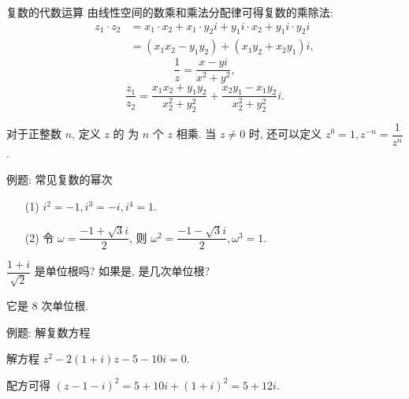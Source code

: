 \begin{frame}{复数的代数运算}
\onslide<+->
\onslide<+->由线性空间的数乘和乘法分配律可得复数的乘除法:
\onslide<+->
\begin{align*}
z_1\cdot z_2&=x_1\cdot x_2+x_1\cdot y_2i+y_1i\cdot x_2+y_1i\cdot y_2i\\
&=(x_1x_2-y_1y_2)+(x_1y_2+x_2y_1)i,
\end{align*}
\onslide<+->\[\frac1{z}=\frac{x-yi}{x^2+y^2},\]
\onslide<+->\[\frac{z_1}{z_2}=\frac{x_1x_2+y_1y_2}{x_2^2+y_2^2}+\frac{x_2y_1-x_1y_2}{x_2^2+y_2^2}i.\]

\onslide<+->对于正整数 $n$, 定义 $z$ 的 为 $n$ 个 $z$ 相乘.
\onslide<+->当 $z\neq 0$ 时, 还可以定义 $z^0=1,z^{-n}=\dfrac1{z^n}$.
\end{frame}


\begin{frame}{例题: 常见复数的幂次}
\beqskip{2pt}
\onslide<+->
\begin{example}
\begin{itemize}
\item[(1)] $i^2=-1,i^3=-i,i^4=1$.
\vspace{-6pt}
\item[(2)] 令 $\omega=\dfrac{-1+\sqrt 3i}2$, 则 $\omega^2=\dfrac{-1-\sqrt3i}2,\omega^3=1$.
\end{itemize}
\end{example}
\onslide<+->
\begin{think}
$\dfrac{1+i}{\sqrt2}$ 是单位根吗? 如果是, 是几次单位根?
\end{think}
\onslide<+->
\begin{answer}
它是 $8$ 次单位根.
\end{answer}
\endgroup
\end{frame}


\begin{frame}{例题: 解复数方程}
\beqskip{6pt}
\onslide<+->
\begin{example}
解方程 $z^2-2(1+i)z-5-10i=0$.
\end{example}
\onslide<+->
\begin{solution}
\indent 配方可得 $(z-1-i)^2=5+10i+(1+i)^2=5+12i$.

\visible<+->{\vspace{-5pt}
	\[x^2-\left(\frac 6x\right)^2=5,\quad
	x^4-5x^2-36=0,\quad x^2=9,\]}
\visible<+->{\[z=1+i\pm(3+2i)=4+3i\ \text{或}\ -2-i.\]}
\end{solution}
\endgroup
\end{frame}


